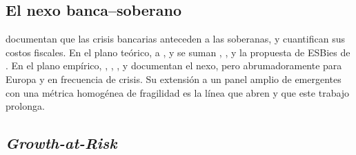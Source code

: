 \subsection{El nexo banca--soberano}

\citet{ReinhartRogoff2009,ReinhartRogoff2011} documentan que las crisis bancarias anteceden a las soberanas, y \citet{LaevenValencia2013,LaevenValencia2020} cuantifican sus costos fiscales. En el plano teórico, a \citet{FarhiTirole2018b}, \citet{AcharyaDrechslerSchnabl2014b} y \citet{GennaioliMartinRossi2014} se suman \citet{Bocola2016}, \citet{BoltonJeanne2011}, \citet{Leonello2018} y la propuesta de ESBies de \citet{BrunnermeierEtAl2016}. En el plano empírico, \citet{ModySandri2012}, \citet{DieckmannPlank2012}, \citet{KallestrupLandoMurgoci2016}, \citet{FratzscherRieth2019} y \citet{AcharyaSteffen2015} documentan el nexo, pero abrumadoramente para Europa y en frecuencia de crisis. Su extensión a un panel amplio de emergentes con una métrica homogénea de fragilidad es la línea que abren \citet{Chari2024b} y que este trabajo prolonga.

\subsection{\textit{Growth-at-Risk}}

